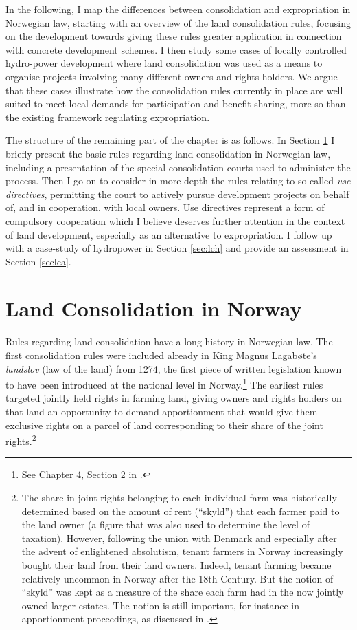 {In the following, I map the differences between consolidation and expropriation in Norwegian law, starting with an overview of the land consolidation rules, focusing on the development towards giving these rules greater application in connection with concrete development schemes. I then study some cases of locally controlled hydro-power development where land consolidation was used as a means to organise projects involving many different owners and rights holders. We argue that these cases illustrate how the consolidation rules currently in place are well suited to meet local demands for participation and benefit sharing, more so than the existing framework regulating expropriation.

The structure of the remaining part of the chapter is as follows. In Section \ref{sec:lcc} I briefly present the basic rules regarding land consolidation in Norwegian law, including a presentation of the special consolidation courts used to administer the process. Then I go on to consider in more depth the rules relating to so-called \emph{use directives}, permitting the court to actively pursue development projects on behalf of, and in cooperation, with local owners. Use directives represent a form of compulsory cooperation which I believe deserves further attention in the context of land development, especially as an alternative to expropriation. I follow up with a case-study of hydropower in Section \ref{sec:lch} and provide an assessment in Section \ref{seclca}. }

\section{Land Consolidation in Norway}\label{sec:lcc}

Rules regarding land consolidation have a long history in Norwegian law. The first consolidation rules were included already in King Magnus Lagabøte's \emph{landslov} (law of the land) from 1274, the first piece of written legislation known to have been introduced at the national level in Norway.\footnote{See Chapter 4, Section 2 in \cite{nou02}.} The earliest rules targeted jointly held rights in farming land, giving owners and rights holders on that land an opportunity to demand apportionment that would give them exclusive rights on a parcel of land corresponding to their share of the joint rights.\footnote{The share in joint rights belonging to each individual farm was historically determined based on the amount of rent (``skyld'') that each farmer paid to the land owner (a figure that was also used to determine the level of taxation). However, following the union with Denmark and especially after the advent of enlightened absolutism, tenant farmers in Norway increasingly bought their land from their land owners.  Indeed, tenant farming became relatively uncommon in Norway after the 18th Century. But the notion of ``skyld'' was kept as a measure of the share each farm had in the now jointly owned larger estates. The notion is still important, for instance in apportionment proceedings, as discussed in \cite{ravna09a}.}

